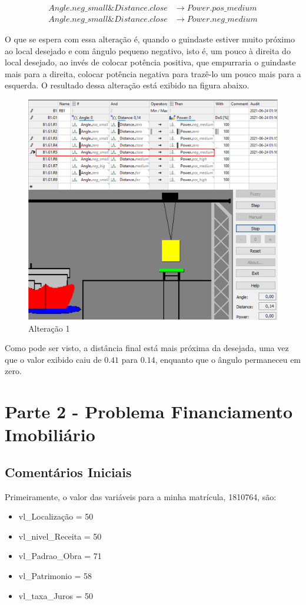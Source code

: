 \documentclass[12pt]{article}
\begin{document}
\begin{align}
	Angle.neg\_small\&Distance.close&\to Power.pos\_medium\\
	Angle.neg\_small\&Distance.close&\to Power.neg\_medium
\end{align}

O que se espera com essa alteração é, quando o guindaste estiver muito próximo ao local desejado e com ângulo pequeno negativo, isto é, um pouco à direita do local desejado, ao invés de colocar potência positiva, que empurraria o guindaste mais para a direita, colocar potência negativa para trazê-lo um pouco mais para a esquerda. O resultado dessa alteração está exibido na figura abaixo.
\begin{figure}[H]
	\centering
	\includegraphics[width=0.8\linewidth]{Imagens/QR2/alteracao1}
	\caption{Alteração 1}
	\label{fig:alteracao1qr2}
\end{figure}

Como pode ser visto, a distância final está mais próxima da desejada, uma vez que o valor exibido caiu de $0.41$ para $0.14$, enquanto que o ângulo permaneceu em zero.

\section{Parte 2 - Problema Financiamento Imobiliário}

\subsection{Comentários Iniciais}

Primeiramente, o valor das variáveis para a minha matrícula, 1810764, são:
\begin{itemize}
	\item vl\_Localização = 50
	\item vl\_nivel\_Receita = 50
	\item vl\_Padrao\_Obra = 71
	\item vl\_Patrimonio = 58
	\item vl\_taxa\_Juros = 50	
\end{itemize}
\end{document}
